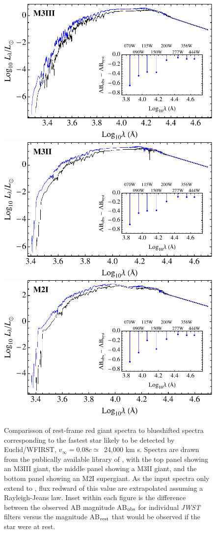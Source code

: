 \documentclass[a4paper,twocolumn]{emulateapj}
\begin{document}
\begin{figure}
\centering\includegraphics[width=0.9\linewidth,clip=true]{spec-m3iii}
\centering\includegraphics[width=0.9\linewidth,clip=true]{spec-m3ii}\\
\centering\includegraphics[width=0.9\linewidth,clip=true]{spec-m2i}\\
\caption{Comparisson of rest-frame red giant spectra to blueshifted spectra corresponding to the fastest star likely to be detected by Euclid/WFIRST, $v_{\infty} = 0.08c \simeq$~24,000 km s. Spectra are drawn from the publically available library of \citet{Pickles:1998a}, with the top panel showing an M3III giant, the middle panel showing a M3II giant, and the bottom panel showing an M2I supergiant. As the input spectra only extend to , flux redward of this value are extrapolated assuming a Rayleigh-Jeans law. Inset within each figure is the difference between the observed AB magnitude AB$_{\rm obs}$ for individual {\it JWST} filters versus the magnitude AB$_{\rm rest}$ that would be observed if the star were at rest.}

\end{figure}
\end{document}
